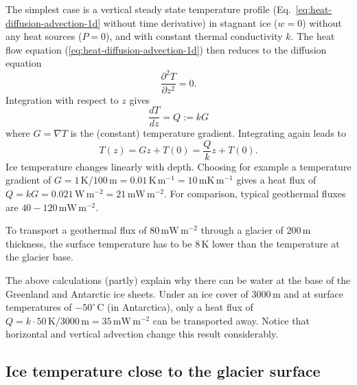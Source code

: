 \documentclass[parskip=half]{scrartcl}
\newcommand{\unit}[1]{\ensuremath{\,\mathrm{#1}}}
\newcommand{\cels}[1]{\ensuremath{#1^{\circ}\,\mathrm{C}}}
\begin{document}
The simplest case is a vertical steady state temperature profile
(Eq.~\ref{eq:heat-diffusion-advection-1d} without time derivative) in
stagnant ice ($w=0$) without any heat sources ($P=0$), and with
constant thermal conductivity $k$.  The heat flow equation
(\ref{eq:heat-diffusion-advection-1d}) then reduces to the diffusion
equation
%
\begin{equation}
 \label{eq:diffusion-1d} \frac{\partial^2T}{\partial z^2} = 0.
\end{equation}
%
Integration with respect to $z$ gives
%
\begin{equation}
 \label{eq:diffusion-1d-1int} \frac{dT}{d z} = Q := k G
\end{equation}
%
where $G = \nabla T$ is the (constant) temperature
gradient. Integrating again leads to
%
\begin{equation}
 \label{eq:diffusion-1d-2int} T(z) = G z + T(0) = \frac{Q}{k} z +
T(0).
\end{equation}
%
Ice temperature changes linearly with depth.  Choosing for example a
temperature gradient of $G=1\unit{K}/ 100\unit{m} =
0.01\unit{K}\unit{m}^{-1} = 10 \unit{mK}\unit{m}^{-1}$ gives a heat
flux of $Q = kG = 0.021\unit{W} \unit{m}^{-2} = 21\unit{mW}
\unit{m}^{-2}$.  For comparison, typical geothermal fluxes are $40-
120 \unit{mW} \unit{m}^{-2}$.

To transport a geothermal flux of $80 \unit{mW} \unit{m}^{-2}$ through
a glacier of $200\unit{m}$ thickness, the surface temperature has to
be $8\unit{K}$ lower than the temperature at the glacier base.

The above calculations (partly) explain why there can be water at the
base of the Greenland and Antarctic ice sheets.  Under an ice cover of
$3000\unit{m}$ and at surface temperatures of \cels{-50} (in
Antarctica), only a heat flux of $Q=k \cdot 50\unit{K}/3000\unit{m}=
35\unit{mW}\unit{m}^{-2}$ can be transported away.  Notice that
horizontal and vertical advection change this result considerably.


\subsection{Ice temperature close to the glacier surface}
\label{sec:ice-temp-surface}
\end{document}
